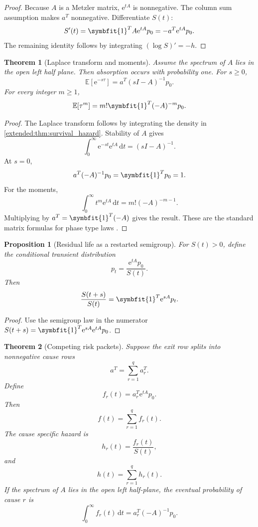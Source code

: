 \documentclass[11pt,letterpaper]{article}
\newtheorem{theorem}{Theorem}[section]
\theoremstyle{plain}
\newtheorem{proposition}[proposition]{Proposition}
\theoremstyle{plain}
\theoremstyle{plain}
\theoremstyle{definition}
\theoremstyle{definition}
\theoremstyle{definition}
\theoremstyle{definition}
\theoremstyle{definition}
\theoremstyle{remark}
\theoremstyle{remark}
\theoremstyle{remark}
\theoremstyle{remark}
\theoremstyle{remark}
\newcommand{\Exp}{\mathbb E}
\theoremstyle{remark}
\newcommand{\e}{\mathrm e}
\newcommand{\one}{\bm 1}
\newcommand{\dd}{\,\mathrm d}
\providecommand{\bm}[1]{\symbfit{#1}}
\let\KomorebiPrimitivemathbb\mathbb
\renewcommand{\mathbb}[1]{{\KomorebiPrimitivemathbb{#1}}}
\let\KomorebiPrimitivemathrm\mathrm
\renewcommand{\mathrm}[1]{{\KomorebiPrimitivemathrm{#1}}}
\begin{document}
\begin{proof}
Because \(A\) is a Metzler matrix, \(\e^{tA}\) is nonnegative. The column sum assumption makes \(a^T\) nonnegative. Differentiate \(S(t)\):
\[
S'(t)=\one^TA\e^{tA}p_0=-a^T\e^{tA}p_0.
\]
The remaining identity follows by integrating \((\log S)'=-h\).
\end{proof}

\begin{theorem}[Laplace transform and moments]\label{extended:record:099}\label{extended:thm:survival_moments}
Assume the spectrum of \(A\) lies in the open left half plane. Then absorption occurs with probability one. For \(s\geq0\),
\[
\Exp[\e^{-s\tau}]
=
a^T(sI-A)^{-1}p_0.
\] For every integer \(m\geq1\),
\[
\Exp[\tau^m]
=
m!\one^T(-A)^{-m}p_0.
\]
\end{theorem}

\begin{proof}
The Laplace transform follows by integrating the density in \cref{extended:thm:survival_hazard}. Stability of \(A\) gives
\[
\int_0^\infty
\e^{-st}\e^{tA}\dd t
=
(sI-A)^{-1}.
\]
At \(s=0\),
\[
a^T(-A)^{-1}p_0
=
\one^Tp_0=1.
\]
For the moments,
\[
\int_0^\infty t^m\e^{tA}\dd t
=
m!(-A)^{-m-1}.
\]
Multiplying by \(a^T=\one^T(-A)\) gives the result. These are the standard matrix formulas for phase type laws \cite{Neuts1981,AsmussenNermanOlsson1996}.
\end{proof}

\begin{proposition}[Residual life as a restarted semigroup]\label{extended:record:100}\label{extended:prop:residual_life}
For \(S(t)>0\), define the conditional transient distribution
\[
p_t
=
\frac{\e^{tA}p_0}{S(t)}.
\]
Then
\[
\frac{S(t+s)}{S(t)}
=
\one^T\e^{sA}p_t.
\]
\end{proposition}

\begin{proof}
Use the semigroup law in the numerator \(S(t+s)=\one^T\e^{sA}\e^{tA}p_0\).
\end{proof}

\begin{theorem}[Competing risk packets]\label{extended:record:101}\label{extended:thm:competing_risks}
Suppose the exit row splits into nonnegative cause rows
\[
a^T
=
\sum_{r=1}^q a_r^T.
\]
Define
\[
f_r(t)=a_r^T\e^{tA}p_0.
\]
Then
\[
f(t)=\sum_{r=1}^qf_r(t).
\]
The cause specific hazard is
\[
h_r(t)=\frac{f_r(t)}{S(t)},
\]
and
\[
h(t)=\sum_{r=1}^qh_r(t).
\]
If the spectrum of \(A\) lies in the open left half-plane, the eventual probability of cause \(r\) is
\[
\int_0^\infty f_r(t)\dd t
=
a_r^T(-A)^{-1}p_0.
\]
\end{theorem}
\end{document}
